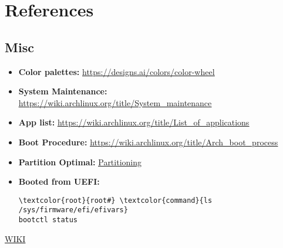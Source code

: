 \documentclass[10pt, a4paper, onecolumn, openany]{book} %
\begin{document}
\chapter{References}
\section{Misc}
\begin{itemize}
    \item \textbf{Color palettes:}
\newline \underline{\href{https://designs.ai/colors/color-wheel}{https://designs.ai/colors/color-wheel}}
\end{itemize}


\begin{itemize}
    \item \textbf{System Maintenance:}
\newline \underline{\href{https://wiki.archlinux.org/title/System\_maintenance}{https://wiki.archlinux.org/title/System\_maintenance}}
    \item \textbf{App list:}
\newline \underline{\href{https://wiki.archlinux.org/title/List\_of\_applications}{https://wiki.archlinux.org/title/List\_of\_applications}}

    \item \textbf{Boot Procedure:}
\newline \underline{\href{https://wiki.archlinux.org/title/Arch\_boot\_process}{https://wiki.archlinux.org/title/Arch\_boot\_process}}
    \item \textbf{Partition Optimal:}
\newline \underline{\href{https://rainbow.chard.org/2013/01/30/how-to-align-partitions-for-best-performance-using-parted/}{Partitioning}}
    \item \textbf{Booted from UEFI:}
\begin{Verbatim}[commandchars=\\\{\}]
\textcolor{root}{root#} \textcolor{command}{ls /sys/firmware/efi/efivars}
bootctl status
\end{Verbatim}
\end{itemize}
\href{https://wiki.archlinux.org/title/General_recommendations}{WIKI}
\end{document}
